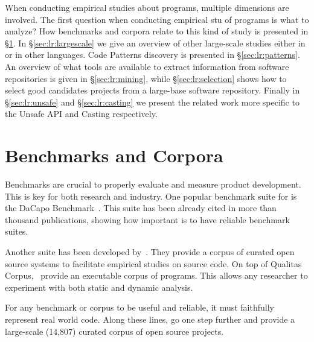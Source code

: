 When conducting empirical studies about programs,
multiple dimensions are involved.
The first question when conducting empirical stu of programs is 
what to analyze?
How benchmarks and corpora relate to this kind of study is presented in \S\ref{sec:lr:benchmarks}.
In \S\ref{sec:lr:largescale} we give an overview of other large-scale studies either in \java{} or in other languages.
Code Patterns discovery is presented in \S\ref{sec:lr:patterns}.
An overview of what tools are available to extract information from software repositories is given in \S\ref{sec:lr:mining},
while \S\ref{sec:lr:selection} shows how to select good candidates projects from a large-base software repository.
Finally in \S\ref{sec:lr:unsafe} and \S\ref{sec:lr:casting} we present the related work more specific to the Unsafe API and Casting respectively.


\section{Benchmarks and Corpora}
\label{sec:lr:benchmarks}

Benchmarks are crucial to properly evaluate and measure product development.
This is key for both research and industry.
One popular benchmark suite for \java{} is the DaCapo Benchmark~\citep{blackburnDaCapoBenchmarksJava2006}.
This suite has been already cited in more than thousand publications, showing how important is to have reliable benchmark suites.

Another suite has been developed by~\cite{temperoQualitasCorpusCurated2010}.
They provide a corpus of curated open source systems to facilitate empirical studies on source code.
On top of Qualitas Corpus,~\cite{dietrichXCorpusExecutableCorpus2017} provide an executable corpus of \java{} programs.
This allows any researcher to experiment with both static and dynamic analysis.

For any benchmark or corpus to be useful and reliable, it must faithfully represent real world code.
Along these lines, \cite{allamanisMiningSourceCode2013} go one step further and provide a large-scale (14,807) curated corpus of open source \java{} projects.

